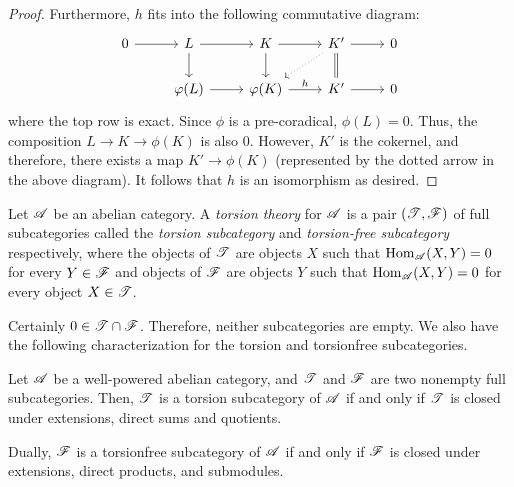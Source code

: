 \begin{proof}
Furthermore, $h$ fits into the following commutative diagram:
\[
\begin{tikzcd}
0 \arrow{r} &
L \arrow{r} \arrow{d} &
K \arrow{r} \arrow{d} &
K' \arrow{r} \arrow[equals]{d} \arrow[dotted]{ld} &
0 \\
& \phi(L) \arrow{r} &
\phi(K) \arrow{r}{h} &
K' \arrow{r} &
0
\end{tikzcd}
\]
where the top row is exact. Since $\phi$ is a pre-coradical, 
$\phi(L) = 0$. Thus, the composition $L \to K \to \phi(K)$ is also
$0$. However, $K'$ is the cokernel, and therefore, there exists a
map $K' \to \phi(K)$ (represented by the dotted arrow in the above 
diagram). It follows that $h$ is an isomorphism as desired.
\end{proof}

\begin{defn}
Let $\mathscr{A}$ be an abelian category. A \emph{torsion theory} for
$\mathscr{A}$ is a pair $(\mathscr{T}, \mathscr{F})$ of full subcategories 
called the \emph{torsion subcategory} and \emph{torsion-free 
subcategory} respectively, where the objects of $\mathscr{T}$ are
objects $X$ such that $\mathrm{Hom}_{\mathscr{A}}(X, Y) = 0$ for every $Y
\in \mathscr{F}$ and objects of $\mathscr{F}$ are objects $Y$ such that
$\mathrm{Hom}_{\mathscr{A}}(X, Y) = 0$ for every object $X \in \mathscr{T}$.
\end{defn}

Certainly $0 \in \mathscr{T} \cap \mathscr{F}$. Therefore, neither 
subcategories are empty. We also have the following characterization
for the torsion and torsionfree subcategories.

\begin{prop}
Let $\mathscr{A}$ be a well-powered abelian category, and $\mathscr{T}$ 
and $\mathscr{F}$ are two nonempty full subcategories. Then, $\mathscr{T}$ 
is a torsion subcategory of $\mathscr{A}$ if and only if $\mathscr{T}$ is 
closed under extensions, direct sums and quotients. 

Dually, $\mathscr{F}$ is a torsionfree subcategory of $\mathscr{A}$ if and 
only if $\mathscr{F}$ is closed under extensions, direct products, and 
submodules.
\end{prop}

